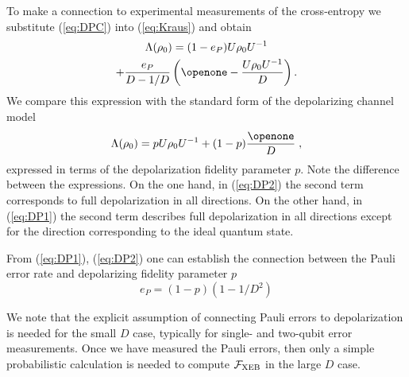 To make a connection to experimental measurements of the cross-entropy we substitute (\ref{eq:DPC}) into (\ref{eq:Kraus}) and obtain
\begin{multline}%
\Lambda(\rho_0)=(1-e_P)U\rho_0 U^{-1}\\+\frac{e_P}{D-1/D}\left(\openone-\frac{ U \rho_0 U^{-1}}{D} \right).\label{eq:DP1}
\end{multline}
We compare this expression with the standard form of the depolarizing channel model 
\begin{align}
  \Lambda(\rho_0) = p U \rho_0 U^{-1} + (1-p) \frac \openone D\;,\label{eq:DP2}
\end{align}
expressed in terms of the depolarization fidelity parameter $p$. Note the difference between the expressions. On the one hand, in (\ref{eq:DP2}) the second term corresponds to full depolarization in all directions. On the other hand, in (\ref{eq:DP1}) the second term describes full depolarization in all directions except for the direction corresponding to the ideal quantum state.

From (\ref{eq:DP1}), (\ref{eq:DP2}) one can establish the connection between the Pauli error rate and depolarizing fidelity parameter $p$
\begin{equation}
e_P=(1-p)(1-1/D^2) 
\end{equation}

We note that the explicit assumption of connecting Pauli errors to depolarization is needed for the small $D$ case, typically for single- and two-qubit error measurements.  Once we have measured the Pauli errors, then only a simple probabilistic calculation is needed to compute $\mathcal{F}_{\text{XEB}}$ in the large $D$ case. 

